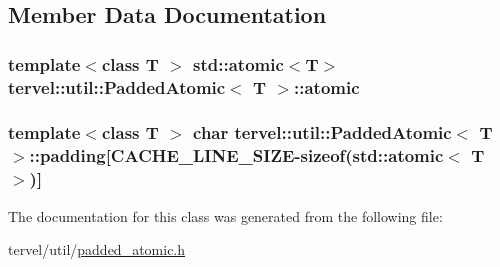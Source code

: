 \subsection{Member Data Documentation}
\hypertarget{classtervel_1_1util_1_1_padded_atomic_a31ed76f17b9e51163c8850dd854eef1c}{}
\subsubsection[{atomic}]{\setlength{\rightskip}{0pt plus 5cm}template$<$class T $>$ std\+::atomic$<$T$>$ {\bf tervel\+::util\+::\+Padded\+Atomic}$<$ T $>$\+::atomic}\label{classtervel_1_1util_1_1_padded_atomic_a31ed76f17b9e51163c8850dd854eef1c}
\hypertarget{classtervel_1_1util_1_1_padded_atomic_a25a8e96cf123a656c36b71ce65747528}{}
\subsubsection[{padding}]{\setlength{\rightskip}{0pt plus 5cm}template$<$class T $>$ char {\bf tervel\+::util\+::\+Padded\+Atomic}$<$ T $>$\+::padding\mbox{[}{\bf C\+A\+C\+H\+E\+\_\+\+L\+I\+N\+E\+\_\+\+S\+I\+Z\+E}-\/sizeof(std\+::atomic$<$ T $>$)\mbox{]}\hspace{0.3cm}{\ttfamily [private]}}\label{classtervel_1_1util_1_1_padded_atomic_a25a8e96cf123a656c36b71ce65747528}


The documentation for this class was generated from the following file\+:\begin{DoxyCompactItemize}
\item 
tervel/util/\hyperlink{padded__atomic_8h}{padded\+\_\+atomic.\+h}\end{DoxyCompactItemize}
